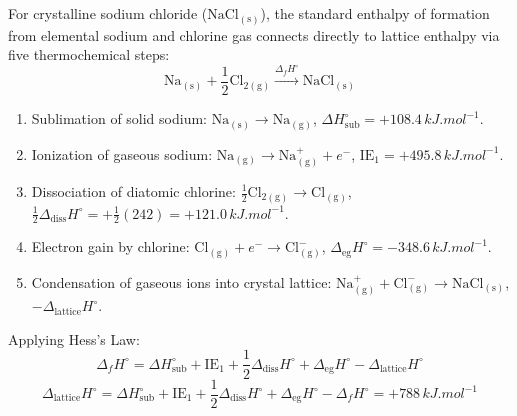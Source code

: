 \documentclass[10pt,twoside,openright]{book}
\begin{document}
\begin{usecasebox}
For crystalline sodium chloride ($\mathrm{NaCl_{(s)}}$), the standard enthalpy of formation from elemental sodium and chlorine gas connects directly to lattice enthalpy via five thermochemical steps:
\begin{equation}
  \mathrm{Na_{(s)}} + \frac{1}{2}\mathrm{Cl_{2(g)}} \xrightarrow{\Delta_f H^\circ} \mathrm{NaCl_{(s)}}
\end{equation}
\begin{enumerate}
  \item Sublimation of solid sodium: $\mathrm{Na_{(s)}} \to \mathrm{Na_{(g)}}$, $\Delta H_{\text{sub}}^\circ = +108.4\,\si{kJ.mol^{-1}}$.
  \item Ionization of gaseous sodium: $\mathrm{Na_{(g)}} \to \mathrm{Na^+_{(g)}} + e^-$, $\text{IE}_1 = +495.8\,\si{kJ.mol^{-1}}$.
  \item Dissociation of diatomic chlorine: $\frac{1}{2}\mathrm{Cl_{2(g)}} \to \mathrm{Cl_{(g)}}$, $\frac{1}{2}\Delta_{\text{diss}} H^\circ = +\frac{1}{2}(242) = +121.0\,\si{kJ.mol^{-1}}$.
  \item Electron gain by chlorine: $\mathrm{Cl_{(g)}} + e^- \to \mathrm{Cl^-_{(g)}}$, $\Delta_{\text{eg}} H^\circ = -348.6\,\si{kJ.mol^{-1}}$.
  \item Condensation of gaseous ions into crystal lattice: $\mathrm{Na^+_{(g)}} + \mathrm{Cl^-_{(g)}} \to \mathrm{NaCl_{(s)}}$, $-\Delta_{\text{lattice}} H^\circ$.
\end{enumerate}
Applying Hess's Law:
\begin{equation}
  \Delta_f H^\circ = \Delta H_{\text{sub}}^\circ + \text{IE}_1 + \frac{1}{2}\Delta_{\text{diss}} H^\circ + \Delta_{\text{eg}} H^\circ - \Delta_{\text{lattice}} H^\circ
\end{equation}
\begin{equation}
  \Delta_{\text{lattice}} H^\circ = \Delta H_{\text{sub}}^\circ + \text{IE}_1 + \frac{1}{2}\Delta_{\text{diss}} H^\circ + \Delta_{\text{eg}} H^\circ - \Delta_f H^\circ = +788\,\si{kJ.mol^{-1}}
\end{equation}
\end{usecasebox}
\end{document}
